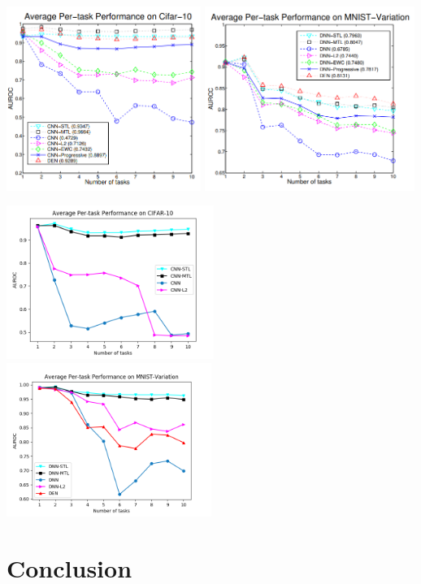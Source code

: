 \documentclass[12pt]{article}
\begin{document}
    \includegraphics[height=6cm]{paper-cifar-10.png}
    \includegraphics[height=6cm]{paper-mnist-var.png}

    \includegraphics[height=5cm]{fig1-s.png}
    \includegraphics[height=5cm]{fig2-v2.png}

    \section {Conclusion}
    
\end{document}

